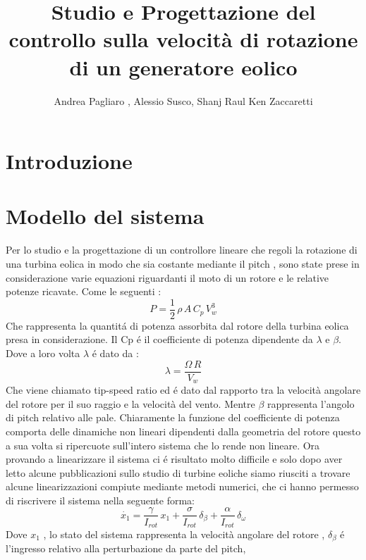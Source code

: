 \documentclass[a4paper,13pt]{article}
\begin{document}
\author{Andrea Pagliaro , Alessio Susco, Shanj Raul Ken Zaccaretti}
\title{Studio e Progettazione del controllo sulla velocità di rotazione di un generatore eolico}
\maketitle
\section{Introduzione}
\section{Modello del sistema}
Per lo studio e la progettazione di un controllore lineare che regoli la rotazione di una turbina eolica in modo che sia costante mediante il pitch , sono state prese in considerazione varie equazioni riguardanti il moto di un rotore e le relative potenze ricavate.
Come le seguenti :
\begin{equation}
P=\frac{1}{2}\,\rho\,A\,C_p\,V_w^3
\end{equation}
Che rappresenta la quantit\'a di potenza assorbita dal rotore della turbina eolica presa in considerazione.
Il Cp \'e il coefficiente di potenza dipendente da $\lambda$ e $\beta$.
Dove a loro volta $\lambda$ \'e dato da :
\begin{equation}
\lambda=\frac{\Omega\,R}{V_w}
\end{equation}
Che viene chiamato tip-speed ratio ed \'e dato dal rapporto tra la velocità angolare
del rotore per il suo raggio e la velocità del vento.
Mentre $\beta$ rappresenta l'angolo di pitch relativo alle pale.
Chiaramente la funzione del coefficiente di potenza comporta delle dinamiche non 
lineari dipendenti dalla geometria del rotore questo a sua volta si ripercuote sull'intero sistema che lo rende non lineare.  
Ora provando a linearizzare il sistema ci \'e risultato molto difficile e solo dopo aver letto alcune pubblicazioni sullo studio di turbine eoliche siamo riusciti a trovare alcune linearizzazioni compiute mediante metodi numerici, che ci hanno permesso di riscrivere il sistema nella seguente forma:
\begin{equation}
\dot{x_1}=\frac{\gamma}{I_{rot}}\,x_1+\frac{\sigma}{I_{rot}}\,\delta_\beta+\frac{\alpha}{I_{rot}}\,\delta_\omega
\end{equation}
Dove $x_1$ , lo stato del sistema rappresenta la velocità angolare del rotore ,
$\delta_\beta$ \'e l'ingresso relativo alla perturbazione da parte del pitch,
\end{document}

